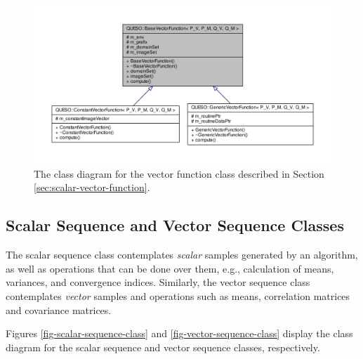 \begin{figure}[htpb]
\centering
\hspace{-40pt}
\includegraphics[scale=0.65,clip=true]{rawfigs/base_vector_function.pdf}
\vspace{-1.2cm}
\caption{The class diagram for the vector function class described in Section \ref{sec:scalar-vector-function}.} %
\label{fig-vector-function-class}
\end{figure}


\subsection{Scalar Sequence and Vector Sequence Classes}\label{sec:scalar-vector-sequence}
%
The scalar sequence class contemplates {\it scalar} samples generated by an algorithm, as well as operations that can
be done over them, e.g., calculation of means, variances, and convergence indices.
Similarly, the vector sequence class contemplates {\it vector} samples and operations such as means, correlation matrices and covariance matrices.

Figures \ref{fig-scalar-sequence-class} and \ref{fig-vector-sequence-class} display the class diagram for the scalar sequence  and vector sequence classes, respectively.

